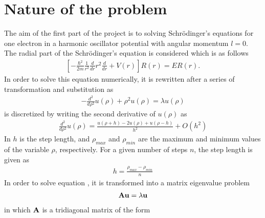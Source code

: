 \section{Nature of the problem}
\label{sec:NatureOfTheProblem}
The aim of the first part of the project is to solving Schr\"{o}dinger’s equations for one electron in a harmonic oscillator potential with angular momentum $l=0$. 
The radial part of the Schr\"{o}dinger’s equation is considered which is as follows
\begin{align}
 \left[ -\frac{\hbar^2}{2 m}  \frac{1}{r^2} \frac{d}{dr} r^2
  \frac{d}{dr} + V(r) \right]R(r) 
       = E R(r).
     \label{eq:NatureOfTheProblem1}
\end{align}
In order to solve this equation numerically, it is rewritten after a series of transformation and substitution as
\begin{align}
	-\frac{d^2}{d\rho^2} u(\rho) + \rho^2u(\rho)  = \lambda u(\rho)
	\label{eq:NatureOfTheProblem2}
\end{align}
 is discretized by writing the second derivative of $u(\rho)$ as 
\begin{align}
	\frac{d^2}{d\rho^2} u(\rho) =\frac{u(\rho+h) -2u(\rho) +u(\rho-h)}{h^2} +O(h^2)
	\label{eq:NatureOfTheProblem3}
\end{align}   
In  $h$ is the step length, and $\rho_{max}$ and $\rho_{min}$ are the maximum and minimum values of the variable $\rho$, respectively. 
For a given number of steps $n$, the step length is given as
\begin{align}
	h=\frac{\rho_{{max}}-\rho_{{min}} }{n}
	\label{eq:NatureOfTheProblem4}
\end{align}
In order to solve equation , it is transformed into a matrix eigenvalue problem 
\begin{align}
	\mbox{\textbf{A}} \mbox{\textbf{u}} = \lambda \mbox{\textbf{u}}
	\label{eq:NatureOfTheProblem5}
\end{align}
in which $\mbox{\textbf{A}}$ is a tridiagonal matrix of the form
